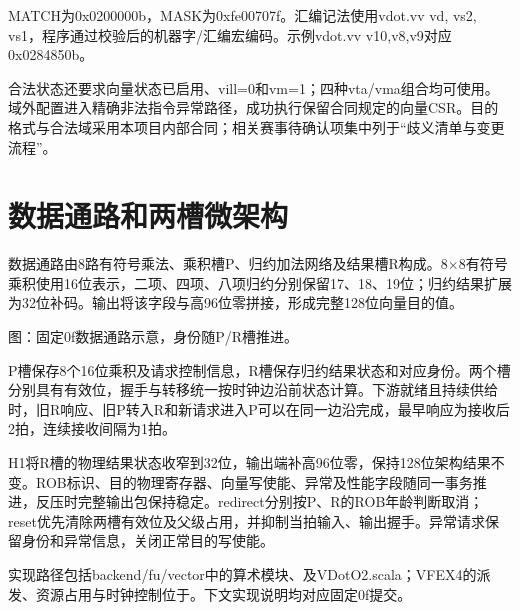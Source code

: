 MATCH为0x0200000b，MASK为0xfe00707f。汇编记法使用vdot.vv vd, vs2, vs1，程序通过校验后的机器字/汇编宏编码。示例vdot.vv v10,v8,v9对应0x0284850b。\par

合法状态还要求向量状态已启用、vill=0和vm=1；四种vta/vma组合均可使用。域外配置进入精确非法指令异常路径，成功执行保留合同规定的向量CSR。目的格式与合法域采用本项目内部合同；相关赛事待确认项集中列于“歧义清单与变更流程”。\par

\section{数据通路和两槽微架构}

数据通路由8路有符号乘法、乘积槽P、归约加法网络及结果槽R构成。8×8有符号乘积使用16位表示，二项、四项、八项归约分别保留17、18、19位；归约结果扩展为32位补码。输出将该字段与高96位零拼接，形成完整128位向量目的值。\par

\begin{center}
\par\small 图：固定0f数据通路示意，身份随P/R槽推进。
\end{center}

P槽保存8个16位乘积及请求控制信息，R槽保存归约结果状态和对应身份。两个槽分别具有有效位，握手与转移统一按时钟边沿前状态计算。下游就绪且持续供给时，旧R响应、旧P转入R和新请求进入P可以在同一边沿完成，最早响应为接收后2拍，连续接收间隔为1拍。\par

H1将R槽的物理结果状态收窄到32位，输出端补高96位零，保持128位架构结果不变。ROB标识、目的物理寄存器、向量写使能、异常及性能字段随同一事务推进，反压时完整输出包保持稳定。redirect分别按P、R的ROB年龄判断取消；reset优先清除两槽有效位及父级占用，并抑制当拍输入、输出握手。异常请求保留身份和异常信息，关闭正常目的写使能。\par

实现路径包括backend/fu/vector中的算术模块、及VDotO2.scala；VFEX4的派发、资源占用与时钟控制位于。下文实现说明均对应固定0f提交。\par

